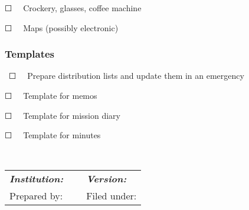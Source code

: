 \documentclass{article}
\begin{document}
☐   Crockery, glasses, coffee machine


☐   Maps (possibly electronic)


\subsubsection{Templates}\label{H1955050}



 ☐   Prepare distribution lists and update them in an emergency


☐   Template for memos


☐   Template for mission diary


☐   Template for minutes


 


\begin{tabu} to \textwidth { |X|X|X| }
\hline



\emph{\textbf{Institution:}} &  & \emph{\textbf{Version:}}
 \\


Prepared by:  &  & Filed under:
 \\
\hline

\end{tabu}

                                                           
\end{document}
